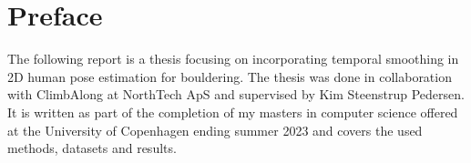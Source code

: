 \documentclass[./main.tex]{subfiles}
\begin{document}
\section*{Preface}
The following report is a thesis focusing on incorporating temporal smoothing in 2D human pose estimation for bouldering. The thesis was done in collaboration with ClimbAlong at NorthTech ApS and supervised by Kim Steenstrup Pedersen. It is written as part of the completion of my masters in computer science offered at the University of Copenhagen ending summer 2023 and covers the used methods, datasets and results.
\end{document}
